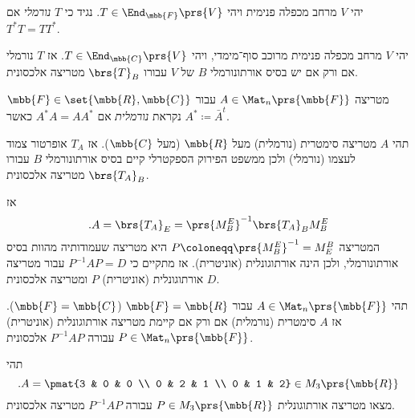 \documentclass[a4paper,10pt,twoside,openany]{book}
\begin{document}
\begin{definition}
יהי
$V$
מרחב מכפלה פנימית ויהי
$T \in \End_{\mbb{F}}\prs{V}$.
נגיד כי
$T$
\emph{נורמלי}
אם
$T^* T = T T^*$.
\end{definition}

\begin{theorem}
יהי
$V$
מרחב מכפלה פנימית מרוכב סוף־מימדי, ויהי
$T \in \End_{\mbb{C}}\prs{V}$.
אז
$T$
נורמלי אם ורק אם יש בסיס אורתונורמלי
$B$
של
$V$
עבורו
$\brs{T}_B$
מטריצה אלכסונית.
\end{theorem}

\begin{definition}
מטריצה
$A \in \Mat_n\prs{\mbb{F}}$
עבור
$\mbb{F} \in \set{\mbb{R}, \mbb{C}}$
נקראת
\emph{נורמלית}
אם
$A^* A = A A^*$
כאשר
$A^* \coloneqq \bar{A}^t$.
\end{definition}

\begin{remark}
תהי
$A$
מטריצה סימטרית (נורמלית) מעל
$\mbb{R}$
(מעל
$\mbb{C}$).
אז
$T_A$
אופרטור צמוד לעצמו (נורמלי) ולכן ממשפט הפירוק הספקטרלי קיים בסיס אורתונורמלי
$B$
עבורו
$\brs{T_A}_B$
מטריצה אלכסונית.

אז
\[\text{.} A = \brs{T_A}_E = \prs{M^E_B}^{-1} \brs{T_A}_B M^E_B\]
המטריצה
$P \coloneqq \prs{M^E_B}^{-1} = M^B_E$
היא מטריצה שעמודותיה מהוות בסיס אורתונורמלי, ולכן הינה אורתוגונלית (אוניטרית). אז מתקיים כי
$P^{-1} A P = D$
עבור מטריצה אורתוגונלית (אוניטרית)
$P$
ומטריצה אלכסונית
$D$.
\end{remark}

\begin{theorem}
תהי
$A \in \Mat_n\prs{\mbb{F}}$
עבור
$\mbb{F} = \mbb{R}$
($\mbb{F} = \mbb{C}$).
אז
$A$
סימטרית (נורמלית) אם ורק אם קיימת מטריצה אורתוגונלית (אוניטרית)
$P \in \Mat_n\prs{\mbb{F}}$
עבורה
$P^{-1} A P$
אלכסונית.
\end{theorem}

\begin{exercisechap}
תהי
\[\text{.} A = \pmat{3 & 0 & 0 \\ 0 & 2 & 1 \\ 0 & 1 & 2} \in M_3\prs{\mbb{R}}\]
מצאו מטריצה אורתוגונלית
$P \in M_3\prs{\mbb{R}}$
עבורה
$P^{-1} A P$
מטריצה אלכסונית.
\end{exercisechap}
\end{document}
